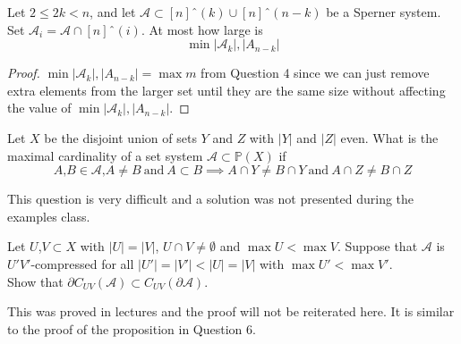 \documentclass[a4paper]{article}
\newcommand{\shadow}{\partial}
\renewcommand{\P}{\mathbb{P}}
\renewcommand{\A}{\mathcal{A}}
\begin{document}
\begin{question}[Question 7]
  Let $2 \leq 2k < n$, and let $\A \subset [n]ˆ{(k)} \cup [n]ˆ(n-k)$ be a
  Sperner system. Set $\A_i = \A \cap [n]ˆ(i)$. At most how large is
  \[\min{|\A_k|, |A_{n-k}|}\]
\end{question}
\begin{proof}
  $\min{|\A_k|, |A_{n-k}|} = \max m$ from Question 4 since we can just remove
  extra elements from the larger set until they are the same size without
  affecting the value of $\min{|\A_k|, |A_{n-k}|}$.
\end{proof}

\begin{question}[Question 8]
  Let $X$ be the disjoint union of sets $Y$ and $Z$ with $|Y|$ and $|Z|$ even.
  What is the maximal cardinality of a set system $\A \subset \P(X)$ if
  \[A \text{,} B \in \A \text{,} A \neq B \ \text{and} \ A \subset B \implies A
    \cap Y \neq B \cap Y \ \text{and} \ A \cap Z \neq B \cap Z\]
\end{question}
\begin{remark}
  This question is very difficult and a solution was not presented during the
  examples class.
\end{remark}

\begin{question}[Question 10]
  Let $U$,$V \subset X$ with $|U| = |V|$, $U \cap V \neq
  \emptyset$ and $\max U < \max V$. Suppose that $\A$ is $U'V'$-compressed for
  all $|U'| = |V'| < |U| = |V|$ with $\max U' < \max V'$.\\
  Show that $\shadow{C_{UV}(\A)} \subset C_{UV}(\shadow{\A})$.
\end{question}
\begin{remark}
  This was proved in lectures and the proof will not be reiterated here. It is
  similar to the proof of the proposition in Question 6.
\end{remark}
\end{document}
